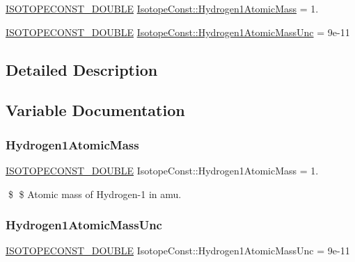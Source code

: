 \begin{DoxyCompactItemize}
\item 
\mbox{\hyperlink{group___isotope_const-_macros_ga8f45a7272ce02c0b4c65c44636ed719a}{I\+S\+O\+T\+O\+P\+E\+C\+O\+N\+S\+T\+\_\+\+D\+O\+U\+B\+LE}} \mbox{\hyperlink{group___isotope_const-_hydrogen-_h1_ga53ebcd107038ebf04ffc673dd61b4d40}{Isotope\+Const\+::\+Hydrogen1\+Atomic\+Mass}} = 1.
\item 
\mbox{\hyperlink{group___isotope_const-_macros_ga8f45a7272ce02c0b4c65c44636ed719a}{I\+S\+O\+T\+O\+P\+E\+C\+O\+N\+S\+T\+\_\+\+D\+O\+U\+B\+LE}} \mbox{\hyperlink{group___isotope_const-_hydrogen-_h1_gabf8a237a4ee232fb7ff93806897ccfc5}{Isotope\+Const\+::\+Hydrogen1\+Atomic\+Mass\+Unc}} = 9e-\/11
\end{DoxyCompactItemize}


\subsection{Detailed Description}


\subsection{Variable Documentation}
\mbox{\label{group___isotope_const-_hydrogen-_h1_ga53ebcd107038ebf04ffc673dd61b4d40}} 
\subsubsection{\texorpdfstring{Hydrogen1\+Atomic\+Mass}{Hydrogen1AtomicMass}}
{\footnotesize\ttfamily \mbox{\hyperlink{group___isotope_const-_macros_ga8f45a7272ce02c0b4c65c44636ed719a}{I\+S\+O\+T\+O\+P\+E\+C\+O\+N\+S\+T\+\_\+\+D\+O\+U\+B\+LE}} Isotope\+Const\+::\+Hydrogen1\+Atomic\+Mass = 1.}

\$ \$ Atomic mass of Hydrogen-\/1 in amu. \mbox{\label{group___isotope_const-_hydrogen-_h1_gabf8a237a4ee232fb7ff93806897ccfc5}} 
\subsubsection{\texorpdfstring{Hydrogen1\+Atomic\+Mass\+Unc}{Hydrogen1AtomicMassUnc}}
{\footnotesize\ttfamily \mbox{\hyperlink{group___isotope_const-_macros_ga8f45a7272ce02c0b4c65c44636ed719a}{I\+S\+O\+T\+O\+P\+E\+C\+O\+N\+S\+T\+\_\+\+D\+O\+U\+B\+LE}} Isotope\+Const\+::\+Hydrogen1\+Atomic\+Mass\+Unc = 9e-\/11}

